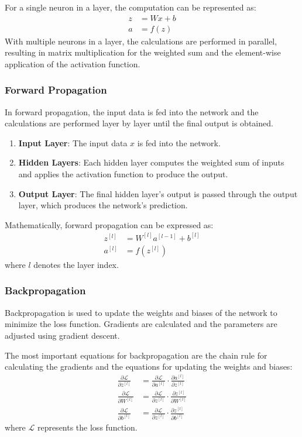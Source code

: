 \documentclass{article}
\begin{document}
For a single neuron in a layer, the computation can be represented as:
\begin{align*}
    z & = Wx + b \\
    a & = f(z)
\end{align*}
With multiple neurons in a layer, the calculations are performed in parallel, resulting in matrix multiplication for the weighted sum and the element-wise application of the activation function.

\subsubsection{Forward Propagation}
In forward propagation, the input data is fed into the network and the calculations are performed layer by layer until the final output is obtained.
\begin{enumerate}
    \item \textbf{Input Layer}: The input data \( x \) is fed into the network.
    \item \textbf{Hidden Layers}: Each hidden layer computes the weighted sum of inputs and applies the activation function to produce the output.
    \item \textbf{Output Layer}: The final hidden layer's output is passed through the output layer, which produces the network's prediction.
\end{enumerate}
Mathematically, forward propagation can be expressed as:
\begin{align*}
    z^{[l]} & = W^{[l]}a^{[l-1]} + b^{[l]} \\
    a^{[l]} & = f(z^{[l]})
\end{align*}
where \( l \) denotes the layer index.
\subsubsection{Backpropagation}

Backpropagation is used to update the weights and biases of the network to minimize the loss function. Gradients are calculated and the parameters are adjusted using gradient descent.

The most important equations for backpropagation are the chain rule for calculating the gradients and the equations for updating the weights and biases:
\begin{align*}
    \frac{\partial \mathcal{L}}{\partial z^{[l]}} & = \frac{\partial \mathcal{L}}{\partial a^{[l]}} \cdot \frac{\partial a^{[l]}}{\partial z^{[l]}} \\
    \frac{\partial \mathcal{L}}{\partial W^{[l]}} & = \frac{\partial \mathcal{L}}{\partial z^{[l]}} \cdot \frac{\partial z^{[l]}}{\partial W^{[l]}} \\
    \frac{\partial \mathcal{L}}{\partial b^{[l]}} & = \frac{\partial \mathcal{L}}{\partial z^{[l]}} \cdot \frac{\partial z^{[l]}}{\partial b^{[l]}}
\end{align*}
where \( \mathcal{L} \) represents the loss function.
\end{document}
